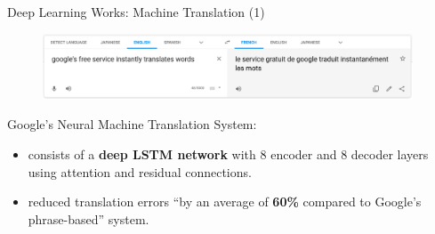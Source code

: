 \documentclass[notheorems]{beamer}
\begin{document}
    \begin{frame}{Deep Learning Works: Machine Translation (1) }

        \begin{figure}
            \includegraphics[width=0.98\textwidth]{figures/google_translate}
        \end{figure}
        Google's Neural Machine Translation System:
        \begin{itemize}
            \item consists of a \textbf{deep LSTM network} with 8 encoder and 8 decoder layers using attention and residual connections.
            \item reduced translation errors ``by an average of \textbf{60\%} compared to Google's phrase-based'' system.
        \end{itemize}

    \end{frame}
\end{document}
